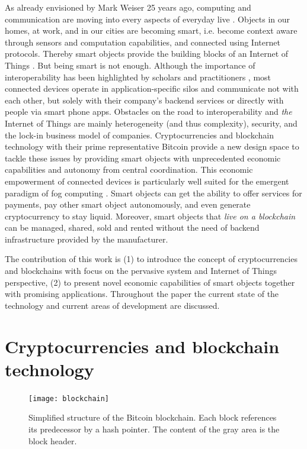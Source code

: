 \documentclass[10pt, conference,compsoc]{IEEEtran}
\begin{document}
  As already envisioned by Mark Weiser 25 years ago, computing and communication are moving into every aspects of everyday live \cite{weiser1991computer}. Objects in our homes, at work, and in our cities are becoming smart, i.e. become context aware through sensors and computation capabilities, and connected using Internet protocols. Thereby smart objects provide the building blocks of an Internet of Things \cite{kortuem2010smart}. But being smart is not enough. Although the importance of interoperability has been highlighted by scholars \cite{zorzi2010} and practitioners \cite{manyika2015unlocking}, most connected devices operate in application-specific silos and communicate not with each other, but solely with their company's backend services or directly with people via smart phone apps.
  Obstacles on the road to interoperability and \textit{the} Internet of Things are mainly heterogeneity (and thus complexity), security, and the lock-in business model of companies.
  Cryptocurrencies and blockchain technology with their prime representative Bitcoin provide a new design space to tackle these issues by providing smart objects with unprecedented economic capabilities and autonomy from central coordination. This economic empowerment of connected devices is particularly well suited for the emergent paradigm of fog computing \cite{Bonomi:2012:FCR:2342509.2342513}. Smart objects can get the ability to offer services for payments, pay other smart object autonomously, and even generate cryptocurrency to stay liquid. Moreover, smart objects that \textit{live on a blockchain} can be managed, shared, sold and rented without the need of backend infrastructure provided by the manufacturer.

  The contribution of this work is (1) to introduce the concept of cryptocurrencies and blockchains with focus on the pervasive system and Internet of Things perspective, (2) to present novel economic capabilities of smart objects together with promising applications. Throughout the paper the current state of the technology and current areas of development are discussed.

  \section{Cryptocurrencies and blockchain technology}
  \label{sec:blockchain}

   \begin{figure}[!t]
    \centering
    \texttt{[image: blockchain]}
    \caption{Simplified structure of the Bitcoin blockchain. Each block references its predecessor by a hash pointer. The content of the gray area is the block header.}
    \label{fig:blockchain}
  \end{figure}
\end{document}
